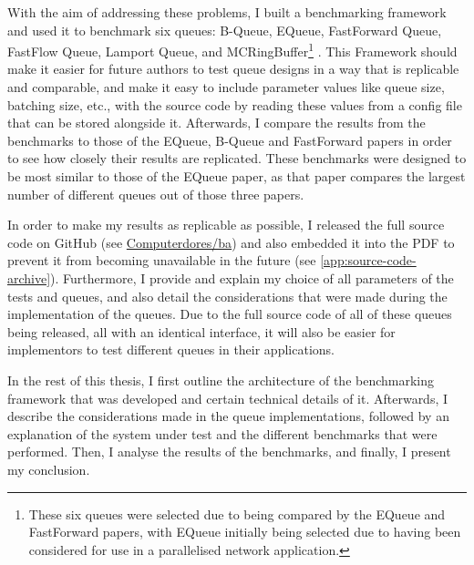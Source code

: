 With the aim of addressing these problems, I built a benchmarking framework and used it to benchmark six
queues: B-Queue, EQueue, FastForward Queue, FastFlow Queue, Lamport Queue, and MCRingBuffer\footnote{These six
    queues were selected due to being compared by the EQueue and FastForward papers, with EQueue initially being
selected due to having been considered for use in a parallelised network application.}
\cite{B-Queue,EQueue,FastForward,FastFlowGithub,Lamport,MCRingBuffer}.
This Framework should make it easier for future authors to test queue designs in a way that is replicable and
comparable, and make it easy to include parameter values like queue size, batching size, etc., with the
source code by reading these values from a config file that can be stored alongside it.
Afterwards, I compare the results from the benchmarks to those of the EQueue, B-Queue and FastForward papers
in order to see how closely their results are replicated.
These benchmarks were designed to be most similar to those of the EQueue paper, as that paper compares the
largest number of different queues out of those three papers.

In order to make my results as replicable as possible, I released the full source code on GitHub (see
\href{https://github.com/Computerdores/ba}{Computerdores/ba}) and also embedded it into the PDF to prevent
it from becoming unavailable in the future (see \autoref{app:source-code-archive}).
Furthermore, I provide and explain my choice of all parameters of the tests and queues, and also detail the
considerations that were made during the implementation of the queues.
Due to the full source code of all of these queues being released, all with an identical interface, it will
also be easier for implementors to test different queues in their applications.

In the rest of this thesis, I first outline the architecture of the benchmarking framework that was developed
and certain technical details of it.
Afterwards, I describe the considerations made in the queue implementations, followed by an explanation of the
system under test and the different benchmarks that were performed.
Then, I analyse the results of the benchmarks, and finally, I present my conclusion.
